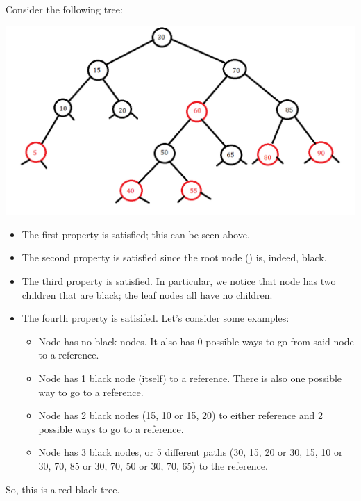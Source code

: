 \documentclass[letterpaper]{article}
\begin{document}
Consider the following tree: 
\begin{center}
    \includegraphics[scale=0.6]{img/rb_tree_1.png}
\end{center}
\begin{itemize}
    \item The first property is satisfied; this can be seen above. 
    \item The second property is satisfied since the root node () is, indeed, black.
    \item The third property is satisfied. In particular, we notice that node  has two children that are black; the leaf nodes all have no children. 
    \item The fourth property is satisifed. Let's consider some examples: 
    \begin{itemize}
        \item Node  has no black nodes. It also has 0 possible ways to go from said node to a  reference. 
        \item Node  has 1 black node (itself) to a  reference. There is also one possible way to go to a  reference.
        \item Node  has 2 black nodes (15, 10 or 15, 20) to either  reference and 2 possible ways to go to a  reference. 
        \item Node  has 3 black nodes, or 5 different paths (30, 15, 20 or 30, 15, 10 or 30, 70, 85 or 30, 70, 50 or 30, 70, 65) to the  reference. %
    \end{itemize}
\end{itemize}
So, this is a red-black tree. 
\end{document}
